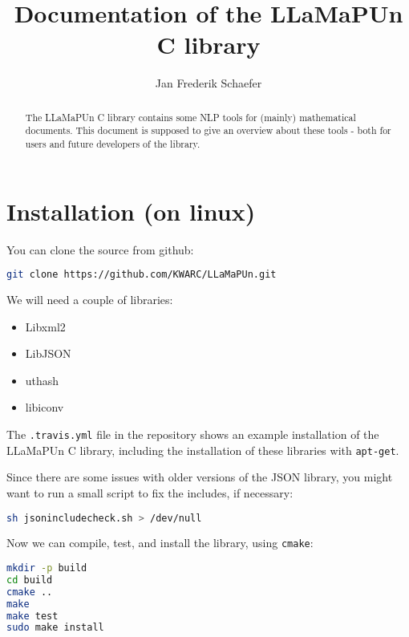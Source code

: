 \documentclass[12pt]{article}
\title{Documentation of the LLaMaPUn C library}
\author{Jan Frederik Schaefer}
\begin{document}
\maketitle

\begin{abstract}
The LLaMaPUn C library contains some NLP tools for (mainly) mathematical documents.
This document is supposed to give an overview about these tools - both for users and
future developers of the library.
\end{abstract}

\tableofcontents

\newpage

\section{Installation (on linux)}

You can clone the source from github:
\begin{lstlisting}[language=bash]
git clone https://github.com/KWARC/LLaMaPUn.git
\end{lstlisting}
We will need a couple of libraries:
\begin{itemize}
\item Libxml2
\item LibJSON
\item uthash
\item libiconv
\end{itemize}
The \texttt{.travis.yml} file in the repository shows an example installation of the LLaMaPUn C library,
including the installation of these libraries with \texttt{apt-get}.

Since there are some issues with older versions of the JSON library,
you might want to run a small script to fix the includes, if necessary:
\begin{lstlisting}[language=bash]
sh jsonincludecheck.sh > /dev/null
\end{lstlisting}
Now we can compile, test, and install the library, using \texttt{cmake}:
\begin{lstlisting}[language=bash]
mkdir -p build
cd build
cmake ..
make
make test
sudo make install
\end{lstlisting}
\end{document}
